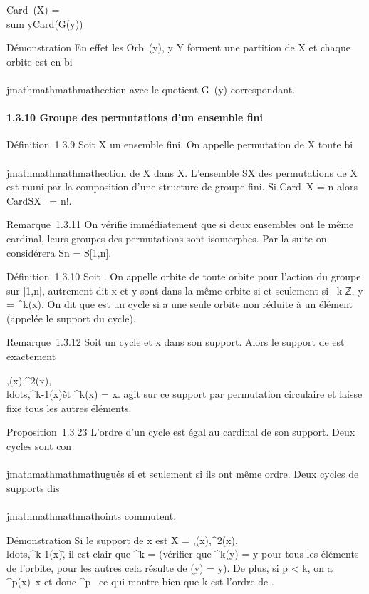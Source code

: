Card~(X) = \\sum
y\inY  Card(G\diagupStab(y))

Démonstration En effet les Orb~(y), y \in Y
forment une partition de X et chaque orbite est en bi\\\\jmathmathmathmathection avec le
quotient G\diagupStab~(y) correspondant.

\paragraph{1.3.10 Groupe des permutations d'un ensemble fini}

Définition~1.3.9 Soit X un ensemble fini. On appelle permutation de X
toute bi\\\\jmathmathmathmathection de X dans X. L'ensemble SX des permutations de
X est muni par la composition d'une structure de groupe fini. Si
Card~X = n alors
CardSX~ = n!.

Remarque~1.3.11 On vérifie immédiatement que si deux ensembles ont le
même cardinal, leurs groupes des permutations sont isomorphes. Par la
suite on considérera Sn = S{[}1,n{]}.

Définition~1.3.10 Soit \sigma \inSn. On appelle orbite de \sigma toute
orbite pour l'action du groupe \langle
\sigma\rangle sur {[}1,n{]}, autrement dit x et y sont dans la
même orbite si et seulement si \exists~k \in ℤ, y =
\sigma^k(x). On dit que \sigma est un cycle si \sigma a une seule orbite non
réduite à un élément (appelée le support du cycle).

Remarque~1.3.12 Soit \sigma un cycle et x dans son support. Alors le support
de \sigma est exactement

\x,\sigma(x),\sigma^2(x),\\ldots,\sigma^k-1(x)\~

et \sigma^k(x) = x. \sigma agit sur ce support par permutation
circulaire et laisse fixe tous les autres éléments.

Proposition~1.3.23 L'ordre d'un cycle est égal au cardinal de son
support. Deux cycles sont con\\\\jmathmathmathmathugués si et seulement si ils ont même
ordre. Deux cycles de supports dis\\\\jmathmathmathmathoints commutent.

Démonstration Si le support de x est X =
\x,\sigma(x),\sigma^2(x),
\\ldots,\sigma^k-1(x)\~,
il est clair que \sigma^k = \mathrmId (vérifier
que \sigma^k(y) = y pour tous les éléments de l'orbite, pour les
autres cela résulte de \sigma(y) = y). De plus, si p \textless{} k, on a
\sigma^p(x)\neq~x et donc
\sigma^p\neq~\mathrmId
ce qui montre bien que k est l'ordre de \sigma.


